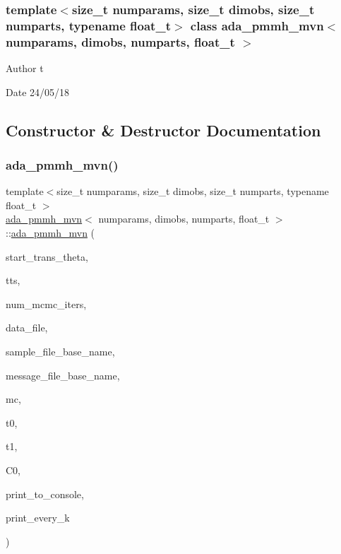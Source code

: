 \subsubsection*{template$<$size\+\_\+t numparams, size\+\_\+t dimobs, size\+\_\+t numparts, typename float\+\_\+t$>$\newline
class ada\+\_\+pmmh\+\_\+mvn$<$ numparams, dimobs, numparts, float\+\_\+t $>$}

\begin{DoxyAuthor}{Author}
t 
\end{DoxyAuthor}
\begin{DoxyDate}{Date}
24/05/18 
\end{DoxyDate}


\subsection{Constructor \& Destructor Documentation}
\mbox{\label{classada__pmmh__mvn_a749d2c42d1c5741edeb55b641dca9625}} 
\subsubsection{\texorpdfstring{ada\+\_\+pmmh\+\_\+mvn()}{ada\_pmmh\_mvn()}}
{\footnotesize\ttfamily template$<$size\+\_\+t numparams, size\+\_\+t dimobs, size\+\_\+t numparts, typename float\+\_\+t $>$ \\
\hyperlink{classada__pmmh__mvn}{ada\+\_\+pmmh\+\_\+mvn}$<$ numparams, dimobs, numparts, float\+\_\+t $>$\+::\hyperlink{classada__pmmh__mvn}{ada\+\_\+pmmh\+\_\+mvn} (\begin{DoxyParamCaption}\item[{const psv \&}]{start\+\_\+trans\+\_\+theta,  }\item[{const std\+::vector$<$ \hyperlink{param__transforms_8h_acee593b112f4fc85f850631b9c6aaae9}{Trans\+Type} $>$ \&}]{tts,  }\item[{const unsigned int \&}]{num\+\_\+mcmc\+\_\+iters,  }\item[{const std\+::string \&}]{data\+\_\+file,  }\item[{const std\+::string \&}]{sample\+\_\+file\+\_\+base\+\_\+name,  }\item[{const std\+::string \&}]{message\+\_\+file\+\_\+base\+\_\+name,  }\item[{const bool \&}]{mc,  }\item[{const unsigned int \&}]{t0,  }\item[{const unsigned int \&}]{t1,  }\item[{const psm \&}]{C0,  }\item[{bool}]{print\+\_\+to\+\_\+console,  }\item[{unsigned int}]{print\+\_\+every\+\_\+k }\end{DoxyParamCaption})}



